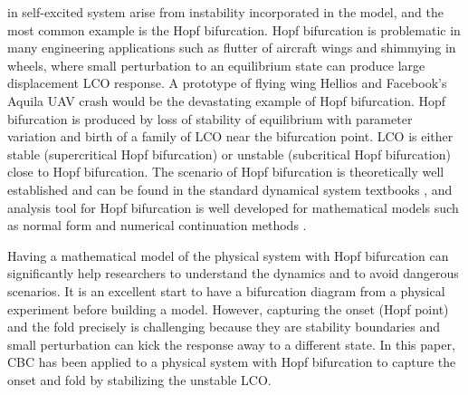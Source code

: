 \documentclass[openacc]{rsproca_new}%
\theoremstyle{own}
\begin{document}
\noindent in self-excited system arise from instability incorporated in the model, and the most common example is the Hopf bifurcation. Hopf bifurcation is problematic in many engineering applications such as flutter of aircraft wings and shimmying in wheels, where small perturbation to an equilibrium state can produce large displacement LCO response. A prototype of flying wing Hellios \cite{noll2004investigation} and Facebook's Aquila UAV crash would be the devastating example of Hopf bifurcation. Hopf bifurcation is produced by loss of stability of equilibrium with parameter variation and birth of a family of LCO near the bifurcation point. LCO is either stable (supercritical Hopf bifurcation) or unstable (subcritical Hopf bifurcation) close to Hopf bifurcation. The scenario of Hopf bifurcation is theoretically well established and can be found in the standard dynamical system textbooks \cite{kuznetsov2013elements}, and analysis tool for Hopf bifurcation is well developed for mathematical models such as normal form \cite{yu2002simplest,ashwin1995numerical} and numerical continuation methods \cite{doedel2000auto2000,dankowicz2013recipes}.

Having a mathematical model of the physical system with Hopf bifurcation can significantly help researchers to understand the dynamics and to avoid dangerous scenarios.  It is an excellent start to have a bifurcation diagram from a physical experiment before building a model. However, capturing the onset (Hopf point) and the fold precisely is challenging because they are stability boundaries and small perturbation can kick the response away to a different state. In this paper, CBC has been applied to a physical system with Hopf bifurcation to capture the onset and fold by stabilizing the unstable LCO.
\end{document}
